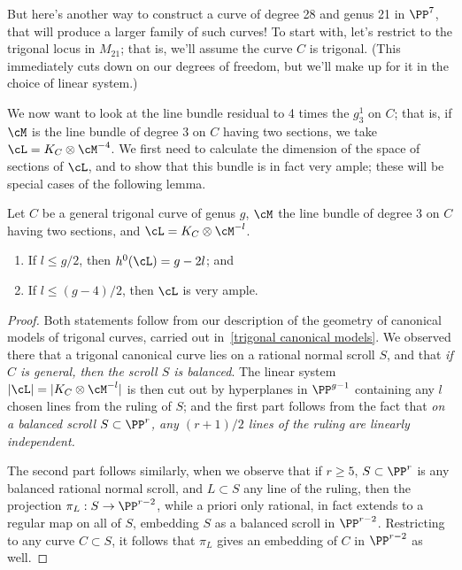But here's another way to construct a curve of degree 28 and genus 21 in $\PP^7$, that will produce a larger family of such curves! To start with, let's restrict to the trigonal locus in $M_{21}$; that is, we'll assume the curve $C$ is trigonal. (This immediately cuts down on our degrees of freedom, but we'll make up for it in the choice of linear system.)

We now want to look at the line bundle residual to 4 times the $g^1_3$ on $C$; that is, if $\cM$ is the line bundle of degree 3 on $C$ having two sections, we take $\cL = K_C \otimes \cM^{-4}$. We first need to calculate the dimension of the space of sections of $\cL$, and to show that this bundle is in fact very ample; these will be special cases of the following lemma.

\begin{lemma}
Let $C$ be a general trigonal curve of genus $g$, $\cM$  the line bundle of degree 3 on $C$ having two sections, and $\cL = K_C \otimes \cM^{-l}$.
\begin{enumerate}
\item If $l \leq g/2$, then $h^0(\cL) = g - 2l$; and
\item If $l \leq (g-4)/2$, then $\cL$ is very ample.
\end{enumerate}
\end{lemma}

\begin{proof}
Both statements follow from our description of the geometry of canonical models of trigonal curves, carried out in~\ref{trigonal canonical models}. We observed there that a trigonal canonical curve lies on a rational normal scroll $S$, and that \emph{if $C$ is general, then the scroll $S$ is balanced}. The linear system $|\cL| = | K_C \otimes \cM^{-l}|$ is then cut out by hyperplanes in $\PP^{g-1}$ containing  any $l$ chosen lines from the ruling of $S$; and the first part follows from the fact that \emph{on a balanced scroll $S \subset \PP^r$, any $(r+1)/2$ lines of the ruling are linearly independent.}

The second part follows similarly, when we observe that if $r \geq 5$, $S \subset \PP^r$ is any balanced rational normal scroll, and $L \subset S$ any line of the ruling, then the projection $\pi_L : S \to \PP^{r-2}$, while a priori only rational, in fact extends to a regular map on all of $S$, embedding $S$ as a balanced scroll in $\PP^{r-2}$. Restricting to any curve $C \subset S$, it follows that $\pi_L$ gives an embedding of $C$ in $\PP^{r-2}$ as well.
\end{proof}

